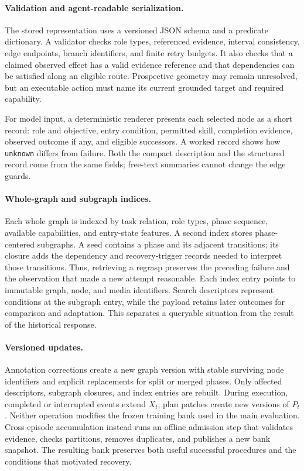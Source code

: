 \documentclass[10pt,twocolumn,letterpaper]{article}
\begin{document}
\paragraph{Validation and agent-readable serialization.}
The stored representation uses a versioned JSON schema and a predicate dictionary. A validator checks role types, referenced evidence, interval consistency, edge endpoints, branch identifiers, and finite retry budgets. It also checks that a claimed observed effect has a valid evidence reference and that dependencies can be satisfied along an eligible route. Prospective geometry may remain unresolved, but an executable action must name its current grounded target and required capability.

For model input, a deterministic renderer presents each selected node as a short record: role and objective, entry condition, permitted skill, completion evidence, observed outcome if any, and eligible successors. A worked record shows how \texttt{unknown} differs from failure. Both the compact description and the structured record come from the same fields; free-text summaries cannot change the edge guards.

\paragraph{Whole-graph and subgraph indices.}
Each whole graph is indexed by task relation, role types, phase sequence, available capabilities, and entry-state features. A second index stores phase-centered subgraphs. A seed contains a phase and its adjacent transitions; its closure adds the dependency and recovery-trigger records needed to interpret those transitions. Thus, retrieving a regrasp preserves the preceding failure and the observation that made a new attempt reasonable. Each index entry points to immutable graph, node, and media identifiers. Search descriptors represent conditions at the subgraph entry, while the payload retains later outcomes for comparison and adaptation. This separates a queryable situation from the result of the historical response.

\paragraph{Versioned updates.}
Annotation corrections create a new graph version with stable surviving node identifiers and explicit replacements for split or merged phases. Only affected descriptors, subgraph closures, and index entries are rebuilt. During execution, completed or interrupted events extend $X_t$; plan patches create new versions of $P_t$. Neither operation modifies the frozen training bank used in the main evaluation. Cross-episode accumulation instead runs an offline admission step that validates evidence, checks partitions, removes duplicates, and publishes a new bank snapshot. The resulting bank preserves both useful successful procedures and the conditions that motivated recovery.
\end{document}
